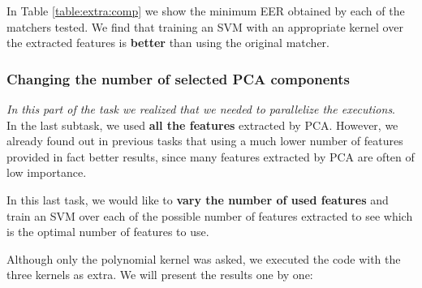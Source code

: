 \documentclass[a4paper]{article}
\begin{document}
In Table \ref{table:extra:comp} we show the minimum EER obtained by each of the matchers tested. We find that training an SVM with an appropriate kernel over the extracted features is \textbf{better} than using the original matcher. 

\subsubsection{Changing the number of selected PCA components}

\emph{In this part of the task we realized that we needed to parallelize the executions}.\\

In the last subtask, we used \textbf{all the features} extracted by PCA. However, we already found out in previous tasks that using a much lower number of features provided in fact better results, since many features extracted by PCA are often of low importance.

In this last task, we would like to \textbf{vary the number of used features} and train an SVM over each of the possible number of features extracted to see which is the optimal number of features to use.

Although only the polynomial kernel was asked, we executed the code with the three kernels as extra. We will present the results one by one:
\end{document}

